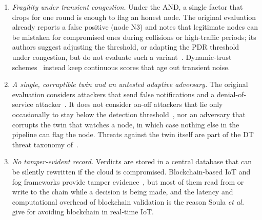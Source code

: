 \documentclass{ieeeaccess}
\begin{document}
\begin{enumerate}
\item \emph{Fragility under transient congestion.}  Under the AND, a
single factor that drops for one round is enough to flag an honest
node.  The original evaluation already reports a false positive
(node N3) and notes that legitimate nodes can be mistaken for
compromised ones during collisions or high-traffic periods; its
authors suggest adjusting the threshold, or adapting the PDR
threshold under congestion, but do not evaluate such a variant~\cite{soula2024iodt}.
Dynamic-trust schemes~\cite{bao2012dynamic,nitti2014trustworthiness}
instead keep continuous scores that age out transient noise.

\item \emph{A single, corruptible twin and an untested adaptive
adversary.}  The original evaluation considers attackers that send
false notifications and a denial-of-service attacker~\cite{soula2024iodt}.
It does not consider on-off attackers that lie only occasionally to
stay below the detection threshold~\cite{sun2006trust},
nor an adversary that corrupts the twin that watches a node, in which
case nothing else in the pipeline can flag the node.  Threats against
the twin itself are part of the DT threat taxonomy
of~\cite{alcaraz2022digital}.

\item \emph{No tamper-evident record.}  Verdicts are stored in a
central database that can be silently rewritten if the cloud is
compromised.  Blockchain-based IoT and fog frameworks provide tamper
evidence~\cite{dorri2017blockchain,novo2018blockchain,kumar2020blockedge,%
dewanta2021bpt,akram2024tmiodt}, but most of them read from or write
to the chain while a decision is being made, and the latency and
computational overhead of blockchain validation is the reason Soula
\textit{et al.}~\cite{soula2024iodt} give for avoiding blockchain in
real-time IoT.
\end{enumerate}
\end{document}
